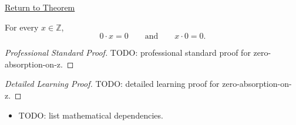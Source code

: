 \newpage
{}
\label{prf:zero-absorption-on-z}

\begin{remark*}[Return]
\hyperref[cor:zero-absorption-on-z]{Return to Theorem}
\end{remark*}

\begin{corollary*}
For every $x\in\mathbb{Z}$,
\[
0\cdot x=0
\qquad\text{and}\qquad
x\cdot 0=0.
\]
\end{corollary*}

\begin{proof}[Professional Standard Proof]
\LRAProofBodyStart
TODO: professional standard proof for zero-absorption-on-z.
\end{proof}

\begin{proof}[Detailed Learning Proof]
\LRAProofBodyStart
TODO: detailed learning proof for zero-absorption-on-z.
\end{proof}

\begin{remark*}
\end{remark*}

\begin{dependencies}
\begin{itemize}
  \item TODO: list mathematical dependencies.
\end{itemize}
\end{dependencies}

\clearpage

